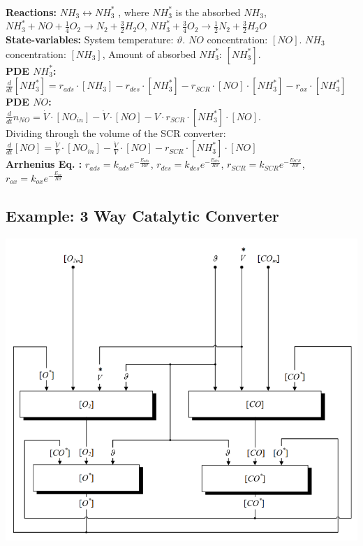 \documentclass[10pt,a4paper]{scrartcl}
\begin{document}
\begin{multicols*}{3}
\begin{minipage}{0.6\columnwidth}
           \end{minipage} \\
\textbf{Reactions:} $NH_3\leftrightarrow NH_3^*$ , where $NH_3^*$ is the absorbed $NH_3$, $NH_3^*+NO+\frac{1}{4}O_2 \rightarrow N_2+\frac{3}{2}H_2O$, $NH_3^*+\frac{3}{4}O_2\rightarrow \frac{1}{2}N_2+\frac{3}{2}H_2O$\\
\textbf{State-variables:} System temperature: $\vartheta$. $NO$ concentration: $[NO]$. $NH_3$ concentration: $[NH_3]$, Amount of absorbed $NH_3^*$: $[NH_3^*]$.\\
\textbf{PDE $NH_3^*$:} \\ $\frac{d}{dt}[NH_3^*]=r_{ads}\cdot [NH_3]-r_{des}\cdot [NH_3^*]-r_{SCR}\cdot [NO]\cdot [NH_3^*]-r_{ox}\cdot [NH_3^*]$\\
\textbf{PDE $NO$:} \\ $\frac{d}{dt}n_{NO}=\dot{V}\cdot [NO_{in}]-\dot{V}\cdot [NO]-V\cdot r_{SCR}\cdot [NH_3^*]\cdot [NO]$.\\
Dividing through the volume of the SCR converter: $\frac{d}{dt}[NO]=\frac{\dot{V}}{V}\cdot [NO_{in}]-\frac{\dot{V}}{V}\cdot [NO]-r_{SCR}\cdot [NH_3^*]\cdot [NO]$\\
\textbf{Arrhenius Eq. :} $r_{ads}=k_{ads}e^{-\frac{E_{ads}}{R\vartheta}}$, $r_{des}=k_{des}e^{-\frac{E_{des}}{R\vartheta}}$, $r_{SCR}=k_{SCR}e^{-\frac{E_{SCR}}{R\vartheta}}$, $r_{ox}=k_{ox}e^{-\frac{E_{ox}}{R\vartheta}}$

\subsection{Example: 3 Way Catalytic Converter}

\includegraphics[width=0.75\columnwidth]{catal.png}


\end{multicols*}
\end{document}
